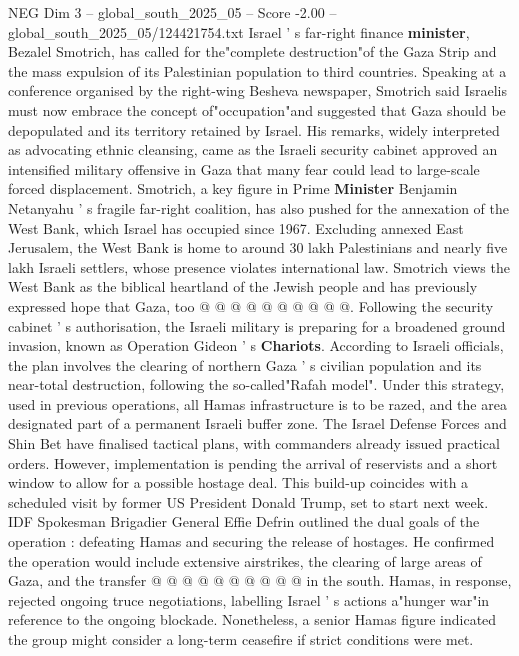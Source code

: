 \begin{textsample}{NEG Dim 3 – global\_south\_2025\_05 – Score -2.00 – global\_south\_2025\_05/124421754.txt}  \label{ex:f3_neg_172}
Israel ' s far-right finance \textbf{minister}, Bezalel Smotrich, has called for the"complete destruction"of the Gaza Strip and the mass expulsion of its Palestinian population to third countries.
Speaking at a conference organised by the right-wing Besheva newspaper, Smotrich said Israelis must now embrace the concept of"occupation"and suggested that Gaza should be depopulated and its territory retained by Israel.
His remarks, widely interpreted as advocating ethnic cleansing, came as the Israeli security cabinet approved an intensified military offensive in Gaza that many fear could lead to large-scale forced displacement.
Smotrich, a key figure in Prime \textbf{Minister} Benjamin Netanyahu ' s fragile far-right coalition, has also pushed for the annexation of the West Bank, which Israel has occupied since 1967.
Excluding annexed East Jerusalem, the West Bank is home to around 30 lakh Palestinians and nearly five lakh Israeli settlers, whose presence violates international law.
Smotrich views the West Bank as the biblical heartland of the Jewish people and has previously expressed hope that Gaza, too @ @ @ @ @ @ @ @ @ @.
Following the security cabinet ' s authorisation, the Israeli military is preparing for a broadened ground invasion, known as Operation Gideon ' s \textbf{Chariots}.
According to Israeli officials, the plan involves the clearing of northern Gaza ' s civilian population and its near-total destruction, following the so-called"Rafah model".
Under this strategy, used in previous operations, all Hamas infrastructure is to be razed, and the area designated part of a permanent Israeli buffer zone.
The Israel Defense Forces and Shin Bet have finalised tactical plans, with commanders already issued practical orders.
However, implementation is pending the arrival of reservists and a short window to allow for a possible hostage deal.
This build-up coincides with a scheduled visit by former US President Donald Trump, set to start next week.
IDF Spokesman Brigadier General Effie Defrin outlined the dual goals of the operation : defeating Hamas and securing the release of hostages.
He confirmed the operation would include extensive airstrikes, the clearing of large areas of Gaza, and the transfer @ @ @ @ @ @ @ @ @ @ in the south.
Hamas, in response, rejected ongoing truce negotiations, labelling Israel ' s actions a"hunger war"in reference to the ongoing blockade.
Nonetheless, a senior Hamas figure indicated the group might consider a long-term ceasefire if strict conditions were met.

\end{textsample}
